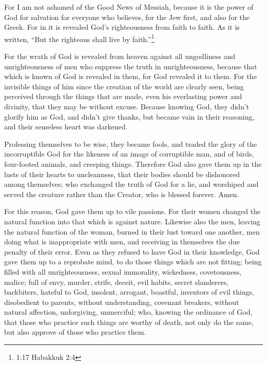 \myverse{}For I am not ashamed of the Good News of Messiah, because it
is the power of God for salvation for everyone who believes, for the Jew first, and also for the Greek.
\myverse{}For in it is revealed God’s righteousness from faith to faith. As it is written,
“But the righteous shall live by faith.”\footnote{1:17 Habakkuk 2:4}

\myverse{}For the wrath of God is revealed from heaven against all ungodliness
and unrighteousness of men who suppress the truth in unrighteousness,
\myverse{}because that which is known of God is revealed in them, for God revealed it
to them.
\myverse{}For the invisible things of him since the creation of the world are clearly
seen, being perceived through the things that are made, even his everlasting power and divinity, that
they may be without excuse.
\myverse{}Because knowing God, they didn’t glorify him as God, and didn’t give thanks,
but became vain in their reasoning, and their senseless heart was darkened.

\myverse{}Professing themselves to be wise, they became fools,
\myverse{}and traded the glory of the incorruptible God for the likeness of an image
of corruptible man, and of birds, four-footed animals, and creeping things.
\myverse{}Therefore God also gave them up in the lusts of their hearts to uncleanness,
that their bodies should be dishonored among themselves;
\myverse{}who exchanged the truth of God for a lie, and worshiped and served the creature
rather than the Creator, who is blessed forever. Amen.

\myverse{}For this reason, God gave them up to vile passions. For their
women changed the natural function into that which is against nature.
\myverse{}Likewise also the men, leaving the natural function of the woman, burned in
their lust toward one another, men doing what is inappropriate with men, and receiving in themselves the
due penalty of their error.
\myverse{}Even as they refused to have God in their knowledge, God gave them up to a
reprobate mind, to do those things which are not fitting;
\myverse{}being filled with all unrighteousness, sexual immorality, wickedness, covetousness,
malice; full of envy, murder, strife, deceit, evil habits, secret slanderers,
\myverse{}backbiters, hateful to God, insolent, arrogant, boastful, inventors of evil
things, disobedient to parents,
\myverse{}without understanding, covenant breakers, without natural affection, unforgiving,
unmerciful;
\myverse{}who, knowing the ordinance of God, that those who practice such things are
worthy of death, not only do the same, but also approve of those who practice them.


